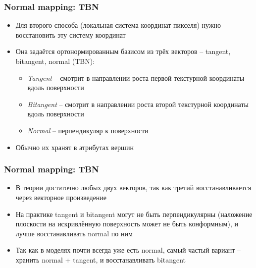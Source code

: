 \documentclass[10pt]{beamer}
\begin{document}
\begin{frame}[fragile]
\frametitle{Normal mapping: TBN}
\begin{itemize}
\item Для второго способа (локальная система координат пикселя) нужно восстановить эту систему координат
\pause
\item Она задаётся ортонормированным базисом из трёх векторов -- tangent, bitangent, normal (TBN):
\pause
\begin{itemize}
\item \textit{Tangent} -- смотрит в направлении роста первой текстурной координаты вдоль поверхности
\item \textit{Bitangent} -- смотрит в направлении роста второй текстурной координаты вдоль поверхности
\item \textit{Normal} -- перпендикуляр к поверхности
\end{itemize}
\pause
\item Обычно их хранят в атрибутах вершин
\end{itemize}
\end{frame}

\begin{frame}[fragile]
\frametitle{Normal mapping: TBN}
\begin{itemize}
\item В теории достаточно любых двух векторов, так как третий восстанавливается через векторное произведение
\pause
\item На практике tangent и bitangent могут не быть перпендикулярны (наложение плоскости на искривлённую поверхность может не быть конформным), и лучше восстанавливать normal по ним
\pause
\item Так как в моделях почти всегда уже есть normal, самый частый вариант -- хранить normal + tangent, и восстанавливать bitangent
\end{itemize}
\end{frame}
\end{document}

